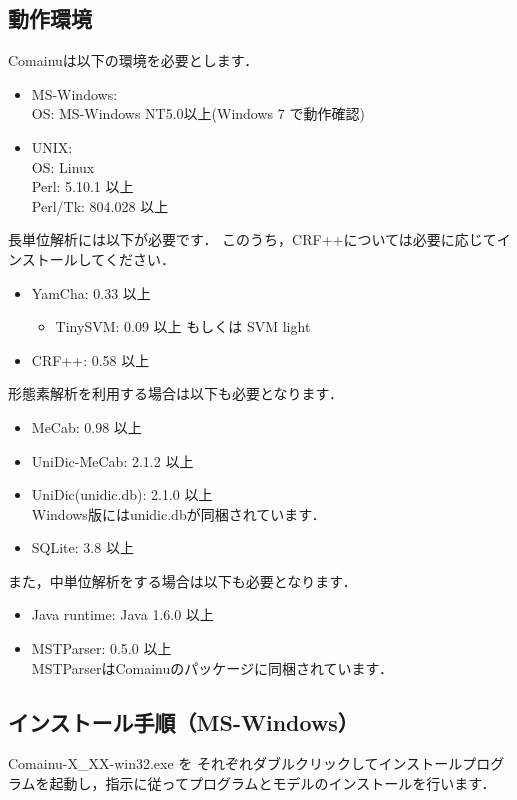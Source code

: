 \documentclass[titlepage]{jarticle}
\begin{document}
\subsection{動作環境}
Comainuは以下の環境を必要とします．
\begin{itemize}
\item MS-Windows: \\
  OS: MS-Windows NT5.0以上(Windows 7 で動作確認)
\item UNIX: \\
  OS: Linux \\
  Perl: 5.10.1 以上\\
  Perl/Tk: 804.028 以上\\
\end{itemize}
長単位解析には以下が必要です．
このうち，CRF++については必要に応じてインストールしてください．
\begin{itemize}
\item YamCha: 0.33 以上
\begin{itemize}
\item TinySVM: 0.09 以上 もしくは SVM light
\end{itemize}
\item CRF++: 0.58 以上
\end{itemize}
形態素解析を利用する場合は以下も必要となります．
\begin{itemize}
\item MeCab: 0.98 以上
\item UniDic-MeCab: 2.1.2 以上
\item UniDic(unidic.db): 2.1.0 以上\\
Windows版にはunidic.dbが同梱されています．
\item SQLite: 3.8 以上
\end{itemize}
また，中単位解析をする場合は以下も必要となります．
\begin{itemize}
\item Java runtime: Java 1.6.0 以上
\item MSTParser: 0.5.0 以上\\
MSTParserはComainuのパッケージに同梱されています．
\end{itemize}

\subsection{インストール手順（MS-Windows）}
Comainu-X\_XX-win32.exe を
それぞれダブルクリックしてインストールプログラムを起動し，指示に従ってプログラムとモデルのインストールを行います．
\end{document}

